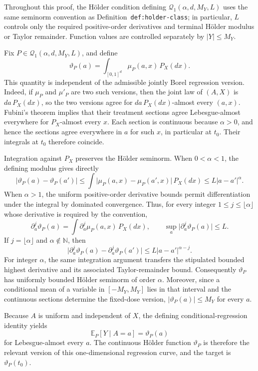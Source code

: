Throughout this proof, the H\"older condition defining \(\mathcal Q_1(\alpha,d,M_Y,L)\) uses the same seminorm convention as Definition~\texttt{def:holder-class}; in particular, \(L\) controls only the required positive-order derivatives and terminal H\"older modulus or Taylor remainder. Function values are controlled separately by \(\lvert Y\rvert\le M_Y\).

Fix \(P\in\mathcal Q_1(\alpha,d,M_Y,L)\), and define
\[
\vartheta_P(a)=\int_{[0,1]^d}\mu_P(a,x)\,P_X(dx).
\]
This quantity is independent of the admissible jointly Borel regression version. Indeed, if \(\mu_P\) and \(\mu'_P\) are two such versions, then the joint law of \((A,X)\) is \(da\,P_X(dx)\), so the two versions agree for \(da\,P_X(dx)\)-almost every \((a,x)\). Fubini's theorem implies that their treatment sections agree Lebesgue-almost everywhere for \(P_X\)-almost every \(x\). Each section is continuous because \(\alpha>0\), and hence the sections agree everywhere in \(a\) for such \(x\), in particular at \(t_0\). Their integrals at \(t_0\) therefore coincide.

Integration against \(P_X\) preserves the H\"older seminorm. When \(0<\alpha<1\), the defining modulus gives directly
\[
\lvert\vartheta_P(a)-\vartheta_P(a')\rvert
\le \int\lvert\mu_P(a,x)-\mu_P(a',x)\rvert\,P_X(dx)
\le L\lvert a-a'\rvert^\alpha.
\]
When \(\alpha>1\), the uniform positive-order derivative bounds permit differentiation under the integral by dominated convergence. Thus, for every integer \(1\le j\le\lfloor\alpha\rfloor\) whose derivative is required by the convention,
\[
\partial_a^j\vartheta_P(a)=\int\partial_a^j\mu_P(a,x)\,P_X(dx),
\qquad
\sup_a\lvert\partial_a^j\vartheta_P(a)\rvert\le L.
\]
If \(j=\lfloor\alpha\rfloor\) and \(\alpha\notin\mathbb N\), then
\[
\lvert\partial_a^j\vartheta_P(a)-\partial_a^j\vartheta_P(a')\rvert
\le L\lvert a-a'\rvert^{\alpha-j}.
\]
For integer \(\alpha\), the same integration argument transfers the stipulated bounded highest derivative and its associated Taylor-remainder bound. Consequently \(\vartheta_P\) has uniformly bounded H\"older seminorm of order \(\alpha\). Moreover, since a conditional mean of a variable in \([-M_Y,M_Y]\) lies in that interval and the continuous sections determine the fixed-dose version, \(\lvert\vartheta_P(a)\rvert\le M_Y\) for every \(a\).

Because \(A\) is uniform and independent of \(X\), the defining conditional-regression identity yields
\[
\mathbb E_P[Y\mid A=a]=\vartheta_P(a)
\]
for Lebesgue-almost every \(a\). The continuous H\"older function \(\vartheta_P\) is therefore the relevant version of this one-dimensional regression curve, and the target is \(\vartheta_P(t_0)\).


